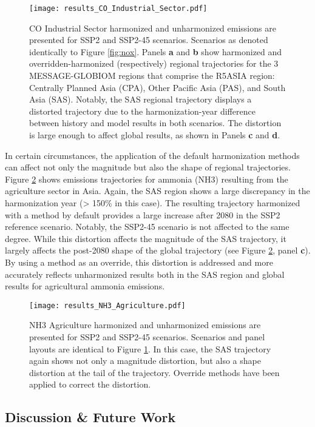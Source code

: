\begin{figure}
  \begin{center}
    \texttt{[image: results\_CO\_Industrial\_Sector.pdf]}
    \caption[]{
      \label{fig:co}
      CO Industrial Sector harmonized and unharmonized emissions are presented
      for SSP2 and SSP2-45 scenarios. Scenarios as denoted identically to Figure
      \ref{fig:nox}. Panels \textbf{a} and \textbf{b} show harmonized and
      overridden-harmonized (respectively) regional trajectories for the 3
      MESSAGE-GLOBIOM regions that comprise the R5ASIA region: Centrally Planned
      Asia (CPA), Other Pacific Asia (PAS), and South Asia (SAS). Notably, the
      SAS regional trajectory displays a distorted trajectory due to the
      harmonization-year difference between history and model results in both
      scenarios. The distortion is large enough to affect global results, as
      shown in Panels \textbf{c} and \textbf{d}.  
}
  \end{center}
\end{figure}

In certain circumstances, the application of the default harmonization methods
can affect not only the magnitude but also the shape of regional
trajectories. Figure \ref{fig:nh3} shows emissions trajectories for ammonia
(NH3) resulting from the agriculture sector in Asia. Again, the SAS region shows
a large discrepancy in the harmonization year (> 150\% in this case). The
resulting trajectory harmonized with a  method by default
provides a large increase after 2080 in the SSP2 reference scenario. Notably,
the SSP2-45 scenario is not affected to the same degree. While this distortion
affects the magnitude of the SAS trajectory, it largely affects the post-2080
shape of the global trajectory (see Figure \ref{fig:nh3}, panel \textbf{c}). By
using a  method as an override, this distortion is
addressed and more accurately reflects unharmonized results both in the SAS
region and global results for agricultural ammonia emissions.

\begin{figure}
  \begin{center}
    \texttt{[image: results\_NH3\_Agriculture.pdf]}
    \caption[]{
      \label{fig:nh3}
      NH3 Agriculture harmonized and unharmonized emissions are presented for
      SSP2 and SSP2-45 scenarios. Scenarios and panel layouts are identical to
      Figure \ref{fig:co}. In this case, the SAS trajectory again shows not only
      a magnitude distortion, but also a shape distortion at the tail of the
      trajectory. Override methods have been applied to correct the distortion.
    }
  \end{center}
\end{figure}


\subsection{Discussion \& Future Work}


